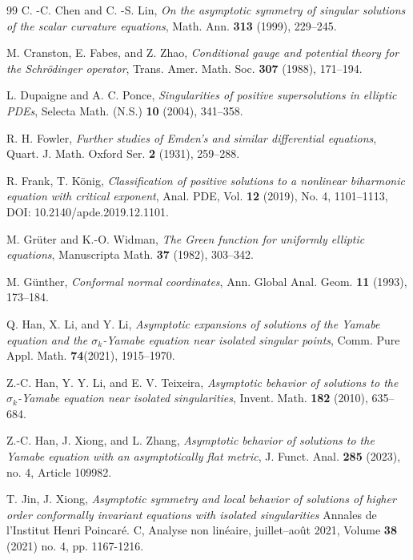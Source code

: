 \documentclass[11pt]{article}
\numberwithin{equation}{section}
\theoremstyle{remark}
\begin{document}
\begin{thebibliography}{99}
C.  -C.  Chen and C.  -S.  Lin,
\emph{On the asymptotic symmetry of singular solutions of the scalar curvature equations},
Math. Ann. \textbf{313} (1999), 229--245.

M.  Cranston, E.  Fabes, and Z.  Zhao,
\emph{Conditional gauge and potential theory for the Schr\"odinger
operator},
Trans. Amer. Math. Soc. \textbf{307} (1988), 171--194.

L.  Dupaigne and A.  C.  Ponce,
\emph{Singularities of positive supersolutions in elliptic PDEs},
Selecta Math. (N.S.) \textbf{10} (2004), 341--358.

R.  H.  Fowler,
\emph{Further studies of Emden's and similar differential equations},
Quart. J. Math. Oxford Ser. \textbf{2} (1931), 259--288.

R.  Frank, T.  König, \emph{Classification of positive solutions to a nonlinear biharmonic equation with
critical exponent}, Anal. PDE, Vol. \textbf{12} (2019), No. 4, 1101–1113, DOI: 10.2140/apde.2019.12.1101.

M.  Gr\"uter and K.-O.  Widman,
\emph{The Green function for uniformly elliptic equations},
Manuscripta Math. \textbf{37} (1982), 303--342.

M.  G\"unther,
\emph{Conformal normal coordinates},
Ann. Global Anal. Geom. \textbf{11} (1993), 173--184.

Q.  Han, X.  Li, and Y.  Li,
\emph{Asymptotic expansions of solutions of the Yamabe equation and the $\sigma_k$-Yamabe equation near isolated singular points},  Comm. Pure Appl. Math. \textbf{74}(2021), 1915–1970.
            
Z.-C.  Han, Y.  Y.  Li, and E.  V.  Teixeira,
\emph{Asymptotic behavior of solutions to the $\sigma_k$-Yamabe equation near isolated singularities},
Invent. Math. \textbf{182} (2010), 635--684.


Z.-C.  Han, J.  Xiong, and L.  Zhang,
\emph{Asymptotic behavior of solutions to the Yamabe equation with an
asymptotically flat metric},
J. Funct. Anal. \textbf{285} (2023), no.  4, Article 109982.

T.  Jin, J.  Xiong,  \emph{Asymptotic symmetry and local behavior of solutions of higher order conformally invariant equations with isolated singularities} Annales de l'Institut Henri Poincaré. C, Analyse non linéaire, juillet–août 2021, Volume \textbf{38} (2021) no. 4, pp. 1167-1216. 


\end{thebibliography}
\end{document}

